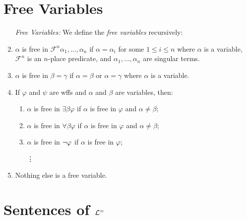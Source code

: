 \documentclass[a4paper, 11pt]{article} %
\begin{document}
\section*{Free Variables}

\begin{enumerate}
  \item[\it Free Variables:] We define the \textit{free variables} recursively:
  \item $\alpha$ is free in $\mathcal{F}^n\alpha_1,\ldots,\alpha_n$ if $\alpha=\alpha_i$ for some $1\leq i\leq n$ where $\alpha$ is a variable, $\mathcal{F}^n$ is an $n$-place predicate, and $\alpha_1,\ldots,\alpha_n$ are singular terms.
  \item $\alpha$ is free in $\beta=\gamma$ if $\alpha=\beta$ or $\alpha=\gamma$ where $\alpha$ is a variable.
  \item If $\varphi$ and $\psi$ are wffs and $\alpha$ and $\beta$ are variables, then:
    \begin{enumerate}
        \item $\alpha$ is free in $\exists\beta\varphi$ if $\alpha$ is free in $\varphi$ and $\alpha\neq\beta$;
        \item $\alpha$ is free in $\forall\beta\varphi$ if $\alpha$ is free in $\varphi$ and $\alpha\neq\beta$;
        \item $\alpha$ is free in $\neg\varphi$ if $\alpha$ is free in $\varphi$;
        \item[\vdots] ~
    \end{enumerate}
  \item Nothing else is a free variable. 
\end{enumerate}





\section*{Sentences of $\mathcal{L}^=$}
\end{document}
